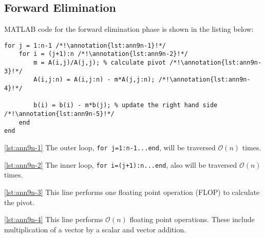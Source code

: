 \subsection{Forward Elimination}
MATLAB code for the forward elimination phase is shown in the listing below:
\begin{lstlisting}[style=myMatlab]
for j = 1:n-1 /*!\annotation{lst:ann9n-1}!*/
    for i = (j+1):n /*!\annotation{lst:ann9n-2}!*/
        m = A(i,j)/A(j,j); % calculate pivot /*!\annotation{lst:ann9n-3}!*/
        A(i,j:n) = A(i,j:n) - m*A(j,j:n); /*!\annotation{lst:ann9n-4}!*/
        
        b(i) = b(i) - m*b(j); % update the right hand side /*!\annotation{lst:ann9n-5}!*/
    end
end
\end{lstlisting}

\vspace{0.1cm}

\noindent \ref{lst:ann9n-1} The outer loop, \lstinline[style=myMatlab]{for j=1:n-1...end}, will be traversed $\mathcal{O}(n)$ times.

\vspace{0.25cm} 

\noindent \ref{lst:ann9n-2} The inner loop, \lstinline[style=myMatlab]{for i=(j+1):n...end}, also will be traversed $\mathcal{O}(n)$ times.  

\vspace{0.25cm}

\noindent \ref{lst:ann9n-3} This line performs one floating point operation (FLOP) to calculate the pivot.

\vspace{0.25cm}

\noindent \ref{lst:ann9n-4} This line performs $\mathcal{O}(n)$ floating point operations.  These include multiplication of a vector by a scalar and vector addition.

\vspace{0.25cm}


